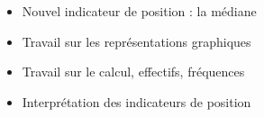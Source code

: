 \begin{prerequis}[Objectifs de 4\up{e}]    
    \begin{itemize}        
        \item Nouvel indicateur de position : la médiane
        \item Travail sur les représentations graphiques
        \item Travail sur le calcul, effectifs, fréquences
        \item Interprétation des indicateurs de position
    \end{itemize}
\end{prerequis}
